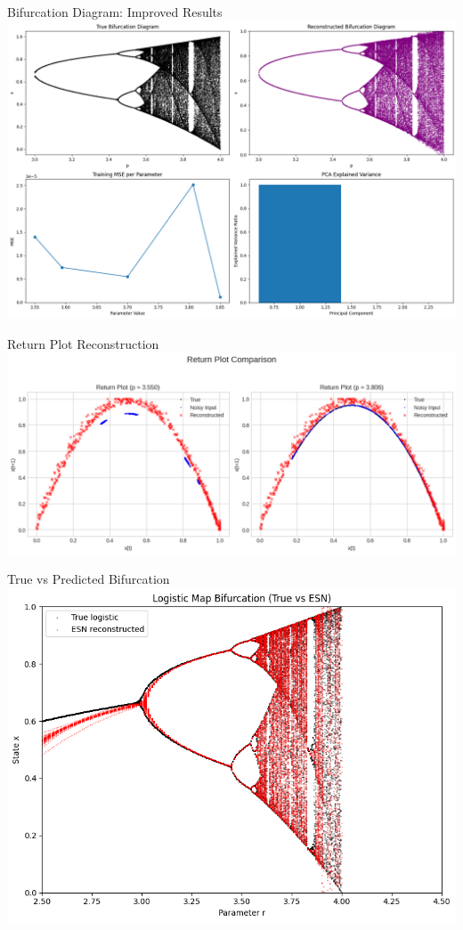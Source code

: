 \documentclass{beamer}
\begin{document}
\begin{frame}{Bifurcation Diagram: Improved Results}
  \includegraphics[width=1\linewidth]{figures/bd_1_results.png}
\end{frame}

\begin{frame}{Return Plot Reconstruction}
  \includegraphics[width=1\linewidth]{figures/bd_return_plot_2.png}
\end{frame}

\begin{frame}{True vs Predicted Bifurcation}
  \includegraphics[width=0.8\linewidth]{figures/bf_3_results_overlapped.png}
\end{frame}
\end{document}
